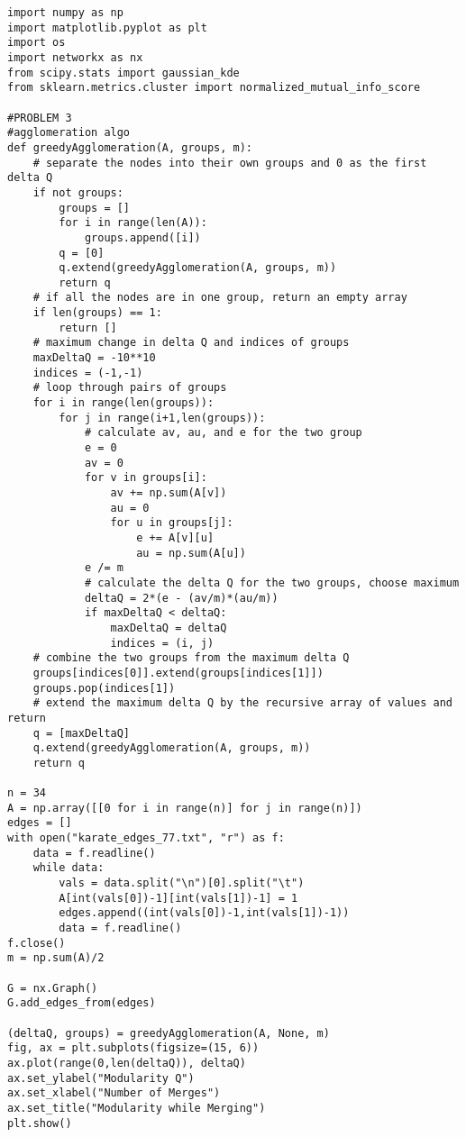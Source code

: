 \documentclass[12pt,letterpaper]{article}
\begin{document}
\newpage
{}
\begin{lstlisting}[style = Python]
import numpy as np
import matplotlib.pyplot as plt
import os
import networkx as nx
from scipy.stats import gaussian_kde
from sklearn.metrics.cluster import normalized_mutual_info_score

#PROBLEM 3
#agglomeration algo
def greedyAgglomeration(A, groups, m):
    # separate the nodes into their own groups and 0 as the first delta Q
    if not groups:
        groups = []
        for i in range(len(A)):
            groups.append([i])
        q = [0]
        q.extend(greedyAgglomeration(A, groups, m))
        return q
    # if all the nodes are in one group, return an empty array
    if len(groups) == 1:
        return []
    # maximum change in delta Q and indices of groups
    maxDeltaQ = -10**10
    indices = (-1,-1)
    # loop through pairs of groups
    for i in range(len(groups)):
        for j in range(i+1,len(groups)):
            # calculate av, au, and e for the two group
            e = 0
            av = 0
            for v in groups[i]:
                av += np.sum(A[v])
                au = 0
                for u in groups[j]:
                    e += A[v][u]
                    au = np.sum(A[u])
            e /= m
            # calculate the delta Q for the two groups, choose maximum
            deltaQ = 2*(e - (av/m)*(au/m))
            if maxDeltaQ < deltaQ:
                maxDeltaQ = deltaQ
                indices = (i, j)
    # combine the two groups from the maximum delta Q
    groups[indices[0]].extend(groups[indices[1]])
    groups.pop(indices[1])
    # extend the maximum delta Q by the recursive array of values and return
    q = [maxDeltaQ]
    q.extend(greedyAgglomeration(A, groups, m))
    return q

n = 34
A = np.array([[0 for i in range(n)] for j in range(n)])
edges = []
with open("karate_edges_77.txt", "r") as f:
    data = f.readline()
    while data:
        vals = data.split("\n")[0].split("\t")
        A[int(vals[0])-1][int(vals[1])-1] = 1
        edges.append((int(vals[0])-1,int(vals[1])-1))
        data = f.readline()
f.close()
m = np.sum(A)/2

G = nx.Graph()
G.add_edges_from(edges)

(deltaQ, groups) = greedyAgglomeration(A, None, m)
fig, ax = plt.subplots(figsize=(15, 6))
ax.plot(range(0,len(deltaQ)), deltaQ)
ax.set_ylabel("Modularity Q")
ax.set_xlabel("Number of Merges")
ax.set_title("Modularity while Merging")
plt.show()


\end{lstlisting}
\end{document}
